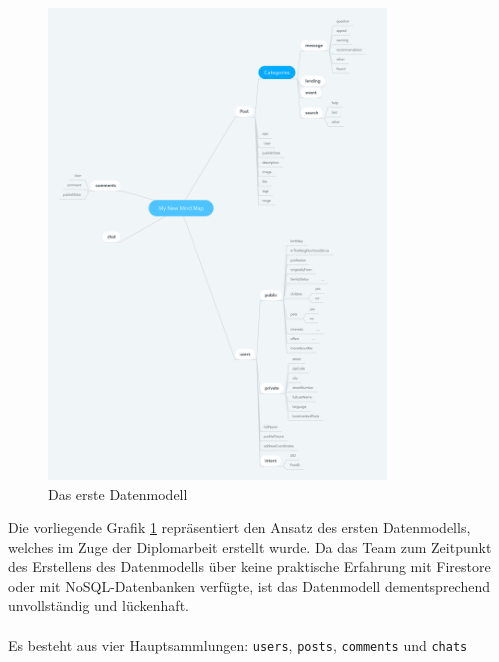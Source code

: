 \begin{figure}[h]
  \centering
  \includegraphics[width=0.8\textwidth]{pics/nochba-erd-old.png}
  \caption{Das erste Datenmodell}
  \label{fig:old-erd}
\end{figure}

Die vorliegende Grafik \ref{fig:old-erd} repräsentiert den Ansatz des ersten Datenmodells, welches im Zuge der Diplomarbeit erstellt wurde. Da das Team zum Zeitpunkt des Erstellens des Datenmodells über keine praktische Erfahrung mit Firestore oder mit NoSQL-Datenbanken verfügte, ist das Datenmodell dementsprechend unvollständig und lückenhaft.
\\\\
Es besteht aus vier Hauptsammlungen: \texttt{users}, \texttt{posts}, \texttt{comments} und \texttt{chats}
\\\\
